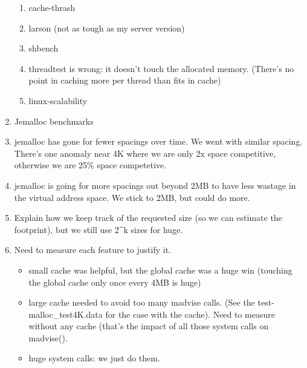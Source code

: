 \begin{enumerate}
\begin{enumerate}
  \item cache-thrash

  \item larson (not as tough as my server version)

  \item shbench

   \item threadtest is wrong: it doesn't touch the allocated memory.  (There's no point in caching more per thread than fits in cache)

  \item linux-scalability

   \end{enumerate}

  \item Jemalloc benchmarks


 \item jemalloc has gone for fewer spacings over time.  We went with
   similar spacing.  There's one anomaly near 4K where we are only 2x
   space competitive, otherwise we are 25\% space competetive.

 \item jemalloc is going for more spacings out beyond 2MB to have less wastage in the virtual address space.  We stick to 2MB, but could do more.

 \item Explain how we keep track of the requested size (so we can estimate the footprint), but we still use 2^k sizes for huge.

 \item Need to measure each feature to justify it.
  \begin{itemize}
  \item small cache was helpful, but the global cache was a huge win (touching the global cache only once every 4MB is huge)
  \item large cache needed to avoid too many madvise calls.  (See the test-malloc\_test4K.data for the case with the cache).  Need to measure without any cache (that's the impact of all those system calls on madvise().
  \item huge system calls: we just do them.
  \end{itemize}


\end{enumerate}
